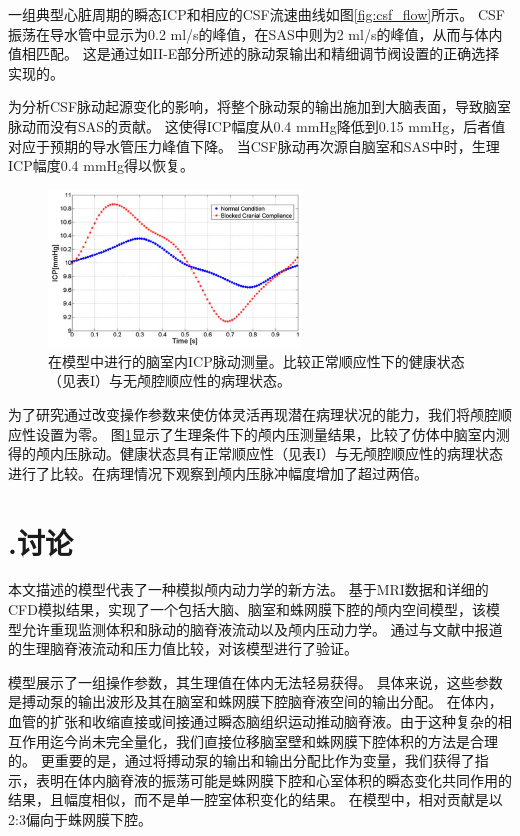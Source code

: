 \documentclass[12pt]{article}
\begin{document}
一组典型心脏周期的瞬态ICP和相应的CSF流速曲线如图\ref{fig:csf_flow}所示。
CSF振荡在导水管中显示为0.2 ml/s的峰值，在SAS中则为2 ml/s的峰值，从而与体内值相匹配。
这是通过如II-E部分所述的脉动泵输出和精细调节阀设置的正确选择实现的。

为分析CSF脉动起源变化的影响，将整个脉动泵的输出施加到大脑表面，导致脑室脉动而没有SAS的贡献。
这使得ICP幅度从0.4 mmHg降低到0.15 mmHg，后者值对应于预期的导水管压力峰值下降。
当CSF脉动再次源自脑室和SAS中时，生理ICP幅度0.4 mmHg得以恢复。

\begin{figure}[!h]
    \centering
    \includegraphics[width=0.6\textwidth]{Figures/7.png}
    \caption{在模型中进行的脑室内ICP脉动测量。比较正常顺应性下的健康状态（见表I）与无颅腔顺应性的病理状态。}
    \label{fig:icp_comparison}
\end{figure}

为了研究通过改变操作参数来使仿体灵活再现潜在病理状况的能力，我们将颅腔顺应性设置为零。
图\ref{fig:icp_comparison}显示了生理条件下的颅内压测量结果，比较了仿体中脑室内测得的颅内压脉动。健康状态具有正常顺应性（见表I）与无颅腔顺应性的病理状态进行了比较。在病理情况下观察到颅内压脉冲幅度增加了超过两倍。




\section*{\uppercase\expandafter{}.讨论}

本文描述的模型代表了一种模拟颅内动力学的新方法。
基于MRI数据和详细的CFD模拟结果，实现了一个包括大脑、脑室和蛛网膜下腔的颅内空间模型，该模型允许重现监测体积和脉动的脑脊液流动以及颅内压动力学。
通过与文献中报道的生理脑脊液流动和压力值比较，对该模型进行了验证。

模型展示了一组操作参数，其生理值在体内无法轻易获得。
具体来说，这些参数是搏动泵的输出波形及其在脑室和蛛网膜下腔脑脊液空间的输出分配。
在体内，血管的扩张和收缩直接或间接通过瞬态脑组织运动推动脑脊液。由于这种复杂的相互作用迄今尚未完全量化，我们直接位移脑室壁和蛛网膜下腔体积的方法是合理的。
更重要的是，通过将搏动泵的输出和输出分配比作为变量，我们获得了指示，表明在体内脑脊液的振荡可能是蛛网膜下腔和心室体积的瞬态变化共同作用的结果，且幅度相似，而不是单一腔室体积变化的结果。
在模型中，相对贡献是以2:3偏向于蛛网膜下腔。
\end{document}
